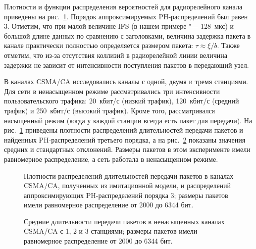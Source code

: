 Плотности и функции распределения вероятностей для радиорелейного канала приведены на рис.~\ref{fig:ch4_fitting_dcf_delays}. Порядок аппроксимируемых PH-распределений был равен 3. Отметим, что при малой величине IFS (в нашем примере "--- 128~мкс) и большой длине данных по сравнению с заголовками, величина задержка пакета в канале практически полностью определяется размером пакета: $\tau \approx \xi / b$. Также отметим, что из-за отсутствия коллизий в радиорелейной линии величина задержки не зависит от интенсивности поступления пакетов в передающий узел.

В каналах CSMA/CA исследовались каналы с одной, двумя и тремя станциями. Для сети в ненасыщенном режиме рассматривались три интенсивности пользовательского трафика: 20~кбит/с (низкий трафик), 120~кбит/с (средний трафик) и 250~кбит/с (высокий трафик). Кроме того, рассматривался насыщенный режим (когда у каждой станции всегда есть пакет для передачи). На рис.~\ref{fig:ch4_fitting_dcf_delays} приведены плотности распределений длительностей передачи пакетов и найденных PH-распределений третьего порядка, а на рис.~\ref{fig:ch4_fitting_dcf_means_123} показаны значения средних и стандартных отклонений. Размеры пакетов в этом эксперименте имели равномерное распределение, а сеть работала в ненасыщенном режиме. 

\begin{figure}[h]
  \caption{Плотности распределений длительностей передачи пакетов в каналах CSMA/CA, полученных из имитационной модели, и распределений аппроксимирующих PH-распределений порядка 3; размеры пакетов имели равномерное распределение от 2000 до 6344 бит.}
  \label{fig:ch4_fitting_dcf_delays}
\end{figure}

\begin{figure}[h]
  \caption{Средние длительности передачи пакетов в ненасыщенных каналах CSMA/CA с 1, 2 и 3 станциями; размеры пакетов имели равномерное распределение от 2000 до 6344 бит.}
  \label{fig:ch4_fitting_dcf_means_123}
\end{figure}

